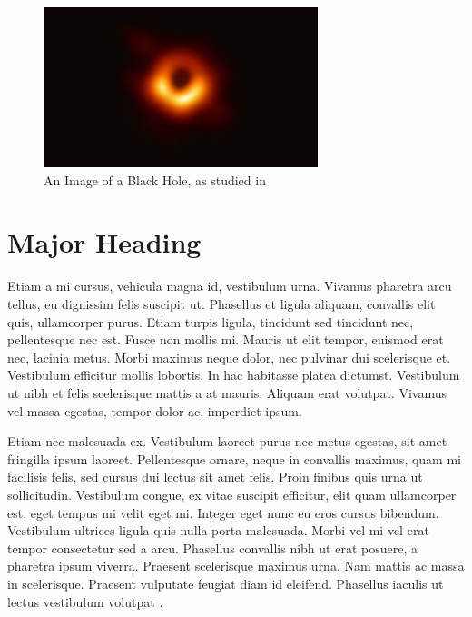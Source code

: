 \documentclass[12pt]{article}
\begin{document}
\begin{figure}[h] %
\centering
\includegraphics[width=8cm]{Black Hole Image.jpg}
\caption{An Image of a Black Hole, as studied in \textcite{hawking_particle_1993}}
\end{figure}

\section*{Major Heading}
Etiam a mi cursus, vehicula magna id, vestibulum urna. Vivamus pharetra arcu tellus, eu dignissim felis suscipit ut. Phasellus et ligula aliquam, convallis elit quis, ullamcorper purus. Etiam turpis ligula, tincidunt sed tincidunt nec, pellentesque nec est. Fusce non mollis mi. Mauris ut elit tempor, euismod erat nec, lacinia metus. Morbi maximus neque dolor, nec pulvinar dui scelerisque et. Vestibulum efficitur mollis lobortis. In hac habitasse platea dictumst. Vestibulum ut nibh et felis scelerisque mattis a at mauris. Aliquam erat volutpat. Vivamus vel massa egestas, tempor dolor ac, imperdiet ipsum.

Etiam nec malesuada ex. Vestibulum laoreet purus nec metus egestas, sit amet fringilla ipsum laoreet. Pellentesque ornare, neque in convallis maximus, quam mi facilisis felis, sed cursus dui lectus sit amet felis. Proin finibus quis urna ut sollicitudin. Vestibulum congue, ex vitae suscipit efficitur, elit quam ullamcorper est, eget tempus mi velit eget mi. Integer eget nunc eu eros cursus bibendum. Vestibulum ultrices ligula quis nulla porta malesuada. Morbi vel mi vel erat tempor consectetur sed a arcu. Phasellus convallis nibh ut erat posuere, a pharetra ipsum viverra. Praesent scelerisque maximus urna. Nam mattis ac massa in scelerisque. Praesent vulputate feugiat diam id eleifend. Phasellus iaculis ut lectus vestibulum volutpat \autocite{amjad_value_2020}.

\pagebreak

\printbibliography %
\end{document}
